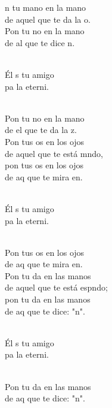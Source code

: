 \begin{cancion}%
	n tu mano en la mano \\
	de aquel que te da la o.\\
	Pon tu no en la mano \\
	de al que te dice n.\\\jump\\
	\begin{chorus}%
	Él s tu amigo \\
	pa la eterni.\\
	\end{chorus}%
	\jump\\
	Pon tu no en la mano \\
	de el que te da la z.\\
	Pon tus os en los ojos\\
	de aquel que te está mndo,\\
	pon tus os en los ojos \\
	de aq que te mira en.\\\jump\\
	\begin{chorus}%
	Él s tu amigo \\
	pa la eterni.\\
	\end{chorus}%
	\jump\\
	Pon tus os en los ojos \\
	de aq que te mira en.\\
	Pon tu da en las manos\\
	de aquel que te está espndo;\\
	pon tu da en las manos\\
	de aq que te dice: "n".\\\jump\\
	\begin{chorus}%
	Él s tu amigo \\
	pa la eterni.\\
	\end{chorus}%
	\jump\\
	Pon tu da en las manos\\
	de aq que te dice: "n".\\
\end{cancion}%
